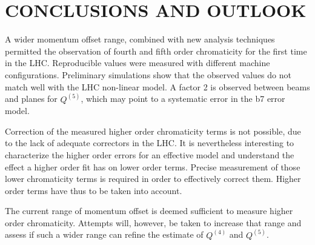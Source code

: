 \section{CONCLUSIONS AND OUTLOOK}

A wider momentum offset range, combined with new analysis techniques permitted the observation of fourth and fifth order chromaticity for the first time in the LHC. Reproducible values were measured with different machine configurations.
Preliminary simulations show that the observed values do not match well with the LHC non-linear model. A factor 2 is observed between beams and planes for $Q^{(5)}$, which may point to a systematic error in the b7 error model.

Correction of the measured higher order chromaticity terms is not possible, due to the lack of adequate
correctors in the LHC. It is nevertheless interesting to characterize the higher order errors for an effective model and understand the effect a higher order fit has on lower order terms.
Precise measurement of those lower chromaticity terms is required in order to effectively correct them. 
Higher order terms have thus to be taken into account.

The current range of momentum offset is deemed sufficient to measure higher order chromaticity. Attempts will, however,
be taken to increase that range and assess if such a wider range can refine the estimate of $Q^{(4)}$ and
$Q^{(5)}$.